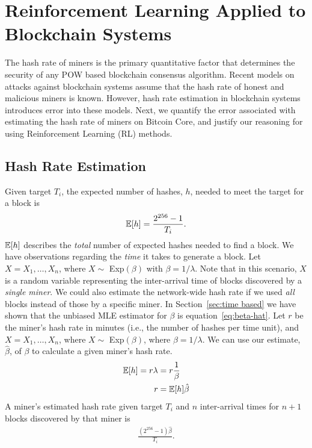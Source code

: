 \chapter{Reinforcement Learning Applied to Blockchain Systems}\label{selfishRL}
The hash rate of miners is the primary quantitative factor that determines the security of any POW based blockchain consensus algorithm. Recent models on attacks against blockchain systems assume that the hash rate of honest and malicious miners is known. However, hash rate estimation in blockchain systems introduces error into these models. Next, we quantify the error associated with estimating the hash rate of miners on Bitcoin Core, and justify our reasoning for using Reinforcement Learning (RL) methods.

\section{Hash Rate Estimation}
Given target $T_i$, the expected number of hashes, $h$, needed to meet the target for a block is
\begin{align}
\operatorname{\mathbb{E}}[h] = \frac{2^{256}-1}{T_i}.
\end{align}
$\operatorname{\mathbb{E}}[h]$ describes the \textit{total} number of expected hashes needed to find a block. We have observations regarding the \textit{time} it takes to generate a block. Let $X = X_1, \dots, X_{n}$, where $X \sim$ Exp$(\beta)$ with $\beta = 1/\lambda$. Note that in this scenario, $X$ is a random variable representing the inter-arrival time of blocks discovered by a {\em single miner}. We could also estimate the network-wide hash rate if we used {\em all} blocks instead of those by a specific miner. In Section~\ref{sec:time based} we have shown that the unbiased MLE estimator for $\beta$ is equation~\ref{eq:beta-hat}. Let $r$ be the miner's hash rate in minutes (i.e., the number of hashes per time unit), and $X = X_1, \dots, X_{n}$, where $X \sim$ Exp$(\beta)$, where $\beta = 1/\lambda$. We can use our estimate, $\hat{\beta}$, of $\beta$ to calculate a given miner's hash rate.
\begin{align}
\operatorname{\mathbb{E}}[h] = r \lambda &= r \frac{1}{\beta}  \\
r &= \operatorname{\mathbb{E}}[h] \hat{\beta}
\end{align}
A miner's estimated hash rate 
given target $T_i$ and $n$ inter-arrival times for $n+1$ blocks discovered by that miner is 
\begin{align}
\frac{(2^{256}-1)\hat{\beta}}{T_i}.
\end{align}
